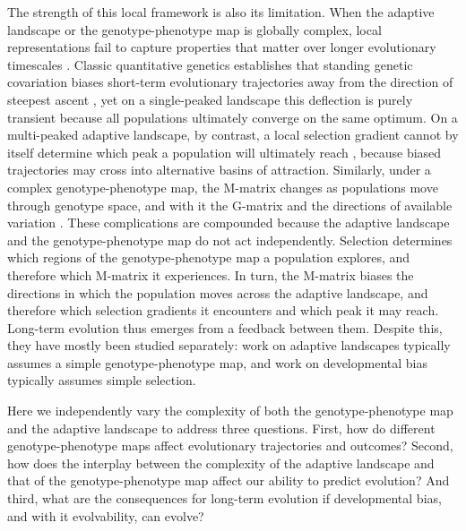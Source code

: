 The strength of this local framework is also its limitation.
When the adaptive landscape or the genotype-phenotype map is globally complex, local representations fail to capture properties that matter over longer evolutionary timescales \parencite{milocco2026mapping}.
Classic quantitative genetics establishes that standing genetic covariation biases short-term evolutionary trajectories away from the direction of steepest ascent \parencite{Schluter1996-uo, lande1979quantitative}, yet on a single-peaked landscape this deflection is purely transient because all populations ultimately converge on the same optimum.
On a multi-peaked adaptive landscape, by contrast, a local selection gradient cannot by itself determine which peak a population will ultimately reach \parencite{melo2016modularity}, because biased trajectories may cross into alternative basins of attraction.
Similarly, under a complex genotype-phenotype map, the M-matrix changes as populations move through genotype space, and with it the G-matrix and the directions of available variation \parencite{cai2025disentangling, milocco2022evolution, rice2002general}.
These complications are compounded because the adaptive landscape and the genotype-phenotype map do not act independently.
Selection determines which regions of the genotype-phenotype map a population explores, and therefore which M-matrix it experiences.
In turn, the M-matrix biases the directions in which the population moves across the adaptive landscape, and therefore which selection gradients it encounters and which peak it may reach.
Long-term evolution thus emerges from a feedback between them.
Despite this, they have mostly been studied separately: work on adaptive landscapes typically assumes a simple genotype-phenotype map, and work on developmental bias typically assumes simple selection.

Here we independently vary the complexity of both the genotype-phenotype map and the adaptive landscape to address three questions.
First, how do different genotype-phenotype maps affect evolutionary trajectories and outcomes?
Second, how does the interplay between the complexity of the adaptive landscape and that of the genotype-phenotype map affect our ability to predict evolution?
And third, what are the consequences for long-term evolution if developmental bias, and with it evolvability, can evolve?

